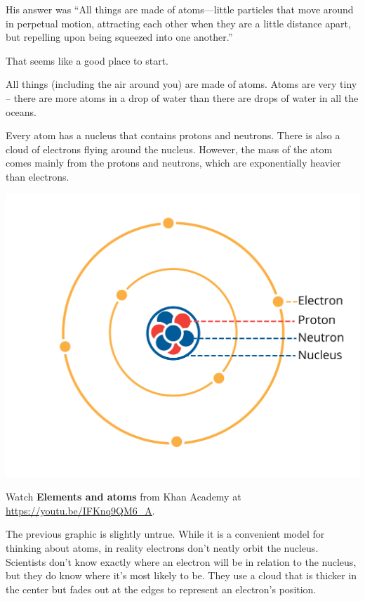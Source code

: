 His answer was ``All things are made of atoms—little particles that move around in
perpetual motion, attracting each other when they are a little
distance apart, but repelling upon being squeezed into one another.''

That seems like a good place to start.

All things (including the air around you) are made of atoms. Atoms are
very tiny -- there are more atoms in a drop of water than there are
drops of water in all the oceans.

Every atom has a nucleus that contains protons and neutrons. There is also
a cloud of electrons flying around the nucleus. However, the mass of the atom
comes mainly from the protons and neutrons, which are exponentially heavier
than electrons.  

\includegraphics[width=1\textwidth]{atom1.png}

Watch \textbf{Elements and atoms} from Khan Academy at \url{https://youtu.be/IFKnq9QM6_A}.


The previous graphic is slightly untrue. While it is a convenient model for thinking about atoms, in reality electrons don't neatly orbit the nucleus. Scientists don't know exactly where an electron will be in relation to the nucleus, but they do know where it's most likely to be. They use a cloud that is thicker in the center but fades out at the edges to represent an electron's position.



